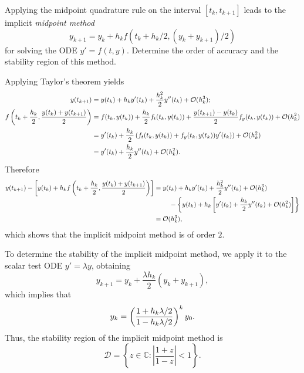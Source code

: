 \begin{pro}
  Applying the midpoint quadrature rule
  on the interval $[t_k, t_{k+1}]$ leads to the implicit
  \emph{midpoint method}
  \begin{displaymath}
    y_{k+1} = y_k + h_kf(t_k+h_k/2, (y_k+y_{k+1})/2)
  \end{displaymath}
  for solving the ODE $y'=f(t,y)$.
  Determine the order of accuracy and
  the stability region of this method.
\end{pro}

\begin{sol}
  Applying Taylor's theorem yields
  \begin{align*}
    y(t_{k+1}) &= y(t_k) + h_ky'(t_k) + \frac{h_k^2}{2}y''(t_k) +
    \mathcal{O}(h_k^3); \\
    f\left( t_k+\frac{h_k}{2}, \frac{y(t_k)+y(t_{k+1})}{2}\right) &= f(t_k, y(t_k)) +
                                                             \frac{h_k}{2}f_t(t_k, y(t_k)) +
                                                             \frac{y(t_{k+1})-y(t_k)}{2}f_y(t_k, y(t_k)) + \mathcal{O}(h_k^2) \\
               &= y'(t_k) + \frac{h_k}{2}\left( f_t(t_k, y(t_k))+f_y(t_k,y(t_k))y'(t_k)\right)
                 + \mathcal{O}(h_k^2) \\
    &= y'(t_k) + \frac{h_k}{2}y''(t_k) + \mathcal{O}(h_k^2).
  \end{align*}
  Therefore
  \begin{align*}
    y(t_{k+1}) - \left[y(t_k)+h_kf\LP t_k+\frac{h_k}{2}, \frac{y(t_k)+y(t_{k+1})}{2}\RP\right] &= \begin{multlined}[t]
      y(t_k) + h_ky'(t_k) + \frac{h_k^2}{2}y''(t_k) +
      \mathcal{O}(h_k^3) \\
      - \left\{y(t_k) + h_k\left[y'(t_k) + \frac{h_k}{2}y''(t_k) + \mathcal{O}(h_k^2)\right]\right\}
    \end{multlined}
    \\
    &= \mathcal{O}(h_k^3),
  \end{align*}
  which shows that the implicit midpoint method is of order $2$.

  To determine the stability of the implicit midpoint method,
  we apply it to the scalar test ODE $y'=\lambda y$,
  obtaining
  \begin{displaymath}
    y_{k+1} = y_k + \frac{\lambda h_k}{2}(y_k+y_{k+1}),
  \end{displaymath}
  which implies that
  \begin{displaymath}
    y_k = \left( \frac{1+h_k\lambda/2}{1-h_k\lambda/2}\right)^ky_0.
  \end{displaymath}
  Thus, the stability region of the implicit midpoint method is
  \begin{displaymath}
    \mathcal{D} = \left\{z\in\mathbb{C}: \left| \frac{1+z}{1-z}\right|<1\right\}.
  \end{displaymath}
\end{sol}
